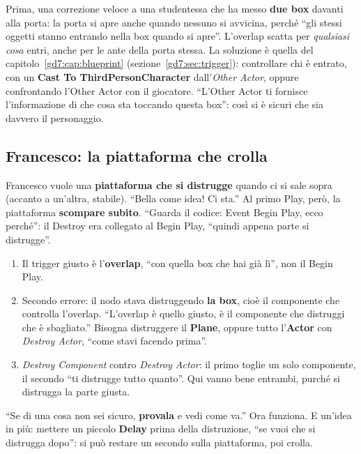 Prima, una correzione veloce a una studentessa che ha messo \textbf{due box}
davanti alla porta: la porta si apre anche quando nessuno si avvicina, perché
``gli stessi oggetti stanno entrando nella box quando si apre''. L'overlap
scatta per \emph{qualsiasi cosa} entri, anche per le ante della porta stessa.
La soluzione è quella del capitolo~\ref{gd7:cap:blueprint}
(sezione~\ref{gd7:sec:trigger}): controllare chi è entrato, con un
\textbf{Cast To ThirdPersonCharacter} dall'\emph{Other Actor}, oppure
confrontando l'Other Actor con il giocatore. ``L'Other Actor ti fornisce
l'informazione di che cosa sta toccando questa box'': così si è sicuri che sia
davvero il personaggio.

\subsection{Francesco: la piattaforma che crolla}

Francesco vuole una \textbf{piattaforma che si distrugge} quando ci si sale
sopra (accanto a un'altra, stabile). ``Bella come idea! Ci sta.'' Al primo Play,
però, la piattaforma \textbf{scompare subito}. ``Guarda il codice: Event Begin
Play, ecco perché'': il Destroy era collegato al Begin Play, ``quindi appena
parte si distrugge''.

\begin{enumerate}
  \item Il trigger giusto è l'\textbf{overlap}, ``con quella box che hai già
        lì'', non il Begin Play.
  \item Secondo errore: il nodo stava distruggendo \textbf{la box}, cioè il
        componente che controlla l'overlap. ``L'overlap è quello giusto, è il
        componente che distruggi che è sbagliato.'' Bisogna distruggere il
        \textbf{Plane}, oppure tutto l'\textbf{Actor} con \emph{Destroy
        Actor}, ``come stavi facendo prima''.
  \item \emph{Destroy Component} contro \emph{Destroy Actor}: il primo toglie
        un solo componente, il secondo ``ti distrugge tutto quanto''. Qui
        vanno bene entrambi, purché si distrugga la parte giusta.
\end{enumerate}
``Se di una cosa non sei sicuro, \textbf{provala} e vedi come va.'' Ora
funziona. E un'idea in più: mettere un piccolo \textbf{Delay} prima della
distruzione, ``se vuoi che si distrugga dopo'': si può restare un secondo sulla
piattaforma, poi crolla.

